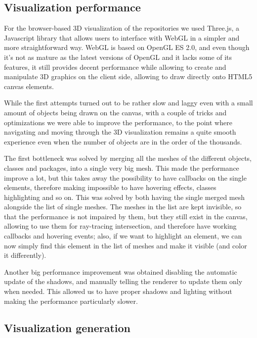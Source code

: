\documentclass[]{usiinfbachelorproject}
\begin{document}
\subsection{Visualization performance} \label{Visualization performance}

For the browser-based 3D visualization of the repositories we used Three.js, a Javascript library that allows users to interface with WebGL in a simpler and more straightforward way. WebGL is based on OpenGL ES 2.0, and even though it's not as mature as the latest versions of OpenGL and it lacks some of its features, it still provides decent performance while allowing to create and manipulate 3D graphics on the client side, allowing to draw directly onto HTML5 canvas elements.

While the first attempts turned out to be rather slow and laggy even with a small amount of objects being drawn on the canvas, with a couple of tricks and optimizations we were able to improve the performance, to the point where navigating and moving through the 3D visualization remains a quite smooth experience even when the number of objects are in the order of the thousands.

The first bottleneck was solved by merging all the meshes of the different objects, classes and packages, into a single very big mesh. This made the performance improve a lot, but this takes away the possibility to have callbacks on the single elements, therefore making impossible to have hovering effects, classes highlighting and so on. This was solved by both having the single merged mesh alongside the list of single meshes. The meshes in the list are kept invisible, so that the performance is not impaired by them, but they still exist in the canvas, allowing to use them for ray-tracing intersection, and therefore have working callbacks and hovering events; also, if we want to highlight an element, we can now simply find this element in the list of meshes and make it visible (and color it differently).

Another big performance improvement was obtained disabling the automatic update of the shadows, and manually telling the renderer to update them only when needed. This allowed us to have proper shadows and lighting without making the performance particularly slower.

\subsection{Visualization generation} \label{Visualization generation}
\end{document}
